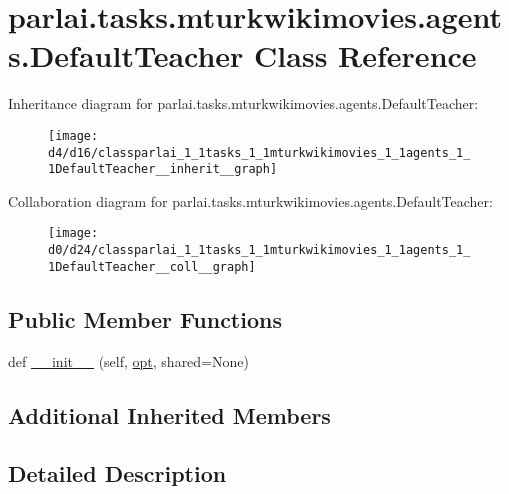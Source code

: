 \hypertarget{classparlai_1_1tasks_1_1mturkwikimovies_1_1agents_1_1DefaultTeacher}{}\section{parlai.\+tasks.\+mturkwikimovies.\+agents.\+Default\+Teacher Class Reference}
\label{classparlai_1_1tasks_1_1mturkwikimovies_1_1agents_1_1DefaultTeacher}


Inheritance diagram for parlai.\+tasks.\+mturkwikimovies.\+agents.\+Default\+Teacher\+:\nopagebreak
\begin{figure}[H]
\begin{center}
\leavevmode
\texttt{[image: d4/d16/classparlai\_1\_1tasks\_1\_1mturkwikimovies\_1\_1agents\_1\_1DefaultTeacher\_\_inherit\_\_graph]}
\end{center}
\end{figure}


Collaboration diagram for parlai.\+tasks.\+mturkwikimovies.\+agents.\+Default\+Teacher\+:\nopagebreak
\begin{figure}[H]
\begin{center}
\leavevmode
\texttt{[image: d0/d24/classparlai\_1\_1tasks\_1\_1mturkwikimovies\_1\_1agents\_1\_1DefaultTeacher\_\_coll\_\_graph]}
\end{center}
\end{figure}
\subsection*{Public Member Functions}
\begin{DoxyCompactItemize}
\item 
def \hyperlink{classparlai_1_1tasks_1_1mturkwikimovies_1_1agents_1_1DefaultTeacher_ae77ddc3240f18cf49cc2c2a5c4dcfb49}{\+\_\+\+\_\+init\+\_\+\+\_\+} (self, \hyperlink{classparlai_1_1core_1_1teachers_1_1FbDialogTeacher_af7a9ec497b9cd0292d7b8fa220da7c28}{opt}, shared=None)
\end{DoxyCompactItemize}
\subsection*{Additional Inherited Members}


\subsection{Detailed Description}


